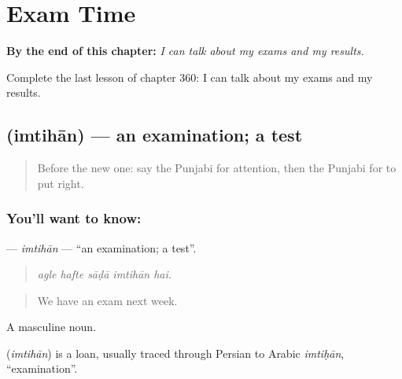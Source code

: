 
\chapter{Exam Time}
\label{ch:pa-a2-exam-time}

\begin{chapteropening}
\textbf{By the end of this chapter:} \emph{I can talk about my exams and my results.}

Complete the last lesson of chapter 360: I can talk about my exams and my results.
\end{chapteropening}

\section[\texorpdfstring{\pa{ਇਮਤਿਹਾਨ} (imtihān)}{ਇਮਤਿਹਾਨ (imtihān)}]{ (imtihān) — an examination; a test}

\label{lesson:PA-C360-imtihan}



\begin{quote}
Before the new one: say the Punjabi for attention, then the Punjabi for to put right.
\end{quote}

\subsection*{You'll want to know: }
\textbf{} — \emph{imtihān} — \textquotedblleft{}an examination; a test\textquotedblright{}.

\begin{quote}
    
\end{quote}

\begin{quote}
\emph{agle hafte sāḍā imtihān hai.}
\end{quote}

\begin{quote}
We have an exam next week.
\end{quote}

A masculine noun.

\begin{cousinweb}
\textbf{} (\emph{imtihān}) is a loan, usually traced through Persian to Arabic \emph{imtiḥān}, \textquotedblleft{}examination\textquotedblright{}.
\end{cousinweb}

